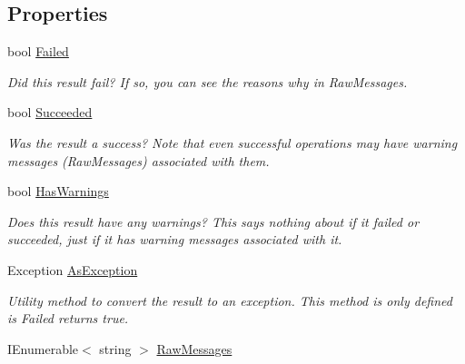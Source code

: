 \subsection*{Properties}
\begin{DoxyCompactItemize}
\item 
bool \hyperlink{struct_full_serializer_1_1fs_result_ac6770cd3b068004050fc45f82736564c}{Failed}
\begin{DoxyCompactList}\small\item\em Did this result fail? If so, you can see the reasons why in {\ttfamily Raw\+Messages}. \end{DoxyCompactList}\item 
bool \hyperlink{struct_full_serializer_1_1fs_result_a09d500a429685b79bec14453423af551}{Succeeded}
\begin{DoxyCompactList}\small\item\em Was the result a success? Note that even successful operations may have warning messages ({\ttfamily Raw\+Messages}) associated with them. \end{DoxyCompactList}\item 
bool \hyperlink{struct_full_serializer_1_1fs_result_a44ec04b6b1e0834f87fd82a10b120f71}{Has\+Warnings}
\begin{DoxyCompactList}\small\item\em Does this result have any warnings? This says nothing about if it failed or succeeded, just if it has warning messages associated with it. \end{DoxyCompactList}\item 
Exception \hyperlink{struct_full_serializer_1_1fs_result_a9bde651297a47eb80ca1e6d14d3647f2}{As\+Exception}
\begin{DoxyCompactList}\small\item\em Utility method to convert the result to an exception. This method is only defined is {\ttfamily Failed} returns true. \end{DoxyCompactList}\item 
I\+Enumerable$<$ string $>$ \hyperlink{struct_full_serializer_1_1fs_result_aaeea44c75b0b24e759e6e46c7259eab1}{Raw\+Messages}

\end{DoxyCompactItemize}
